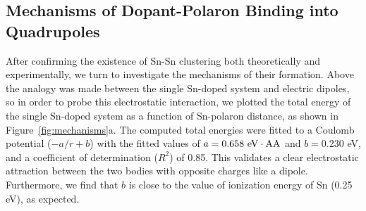 \subsection{Mechanisms of Dopant-Polaron Binding into Quadrupoles}
%

After confirming the existence of Sn-Sn clustering both theoretically and experimentally, we turn to investigate the mechanisms of their formation.
Above the analogy was made between the single Sn-doped system and electric dipoles,
so in order to probe this electrostatic interaction, we plotted the total energy of the single Sn-doped system as a function of Sn-polaron distance, as shown in Figure~\ref{fig:mechanisms}a.
The computed total energies were fitted to a Coulomb potential ($-a/r+b$) with the fitted values of $a=0.658\ {\rm eV\cdot\text{AA}}$ and $b=0.230$ eV, and a coefficient of determination ($R^2$) of 0.85.
This validates a clear electrostatic attraction between the two bodies with opposite charges like a dipole.
Furthermore, we find that $b$ is close to the value of ionization energy of Sn (0.25 eV), as expected.

